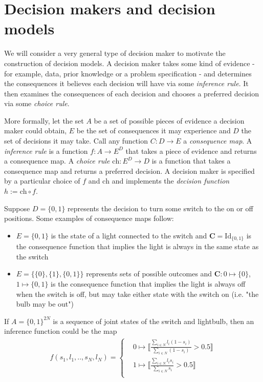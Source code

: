 \section{Decision makers and decision models}

We will consider a very general type of decision maker to motivate the construction of decision models. A decision maker takes some kind of evidence - for example, data, prior knowledge or a problem specification - and determines the consequences it believes each decision will have via some \emph{inference rule}. It then examines the consequences of each decision and chooses a preferred decision via some \emph{choice rule}. 

More formally, let the set $A$ be a set of possible pieces of evidence a decision maker could obtain, $E$ be the set of consequences it may experience and $D$ the set of decisions it may take. Call any function $C:D\to E$ a \emph{consequence map}. A \emph{inference rule} is a function $f:A\to E^D$ that takes a piece of evidence and returns a consequence map. A \emph{choice rule} $\mathrm{ch}:E^D\to D$ is a function that takes a consequence map and returns a preferred decision. A decision maker is specified by a particular choice of $f$ and $\mathrm{ch}$ and implements the \emph{decision function} $h:=\mathrm{ch}\circ f$.

Suppose $D=\{0,1\}$ represents the decision to turn some switch to the on or off positions. Some examples of consequence maps follow:
\begin{itemize}
	\item $E=\{0,1\}$ is the state of a light connected to the switch and $\mathbf{C}=\mathrm{Id}_{\{0,1\}}$ is the consequence function that implies the light is always in the same state as the switch
	\item $E=\{\{0\},\{1\},\{0,1\}\}$ represents sets of possible outcomes and $\mathbf{C}:0\mapsto \{0\}$, $1\mapsto\{0,1\}$ is the consequence function that implies the light is always off when the switch is off, but may take either state with the switch on (i.e. "the bulb may be out")
\end{itemize}

If $A=\{0,1\}^{2N}$ is a sequence of joint states of the switch and lightbulb, then an inference function could be the map
\begin{align}
	f(s_{1},l_{1},..,s_N,l_N) = \begin{cases}
									&0\mapsto \llbracket\frac{\sum_{i\in N} l_i(1-s_i)}{\sum_{i\in N} (1-s_i)}>0.5\rrbracket\\
									&1\mapsto \llbracket\frac{\sum_{i\in N} l_i s_i}{\sum_{i\in N} s_i}>0.5\rrbracket\\
								\end{cases}
\end{align}

